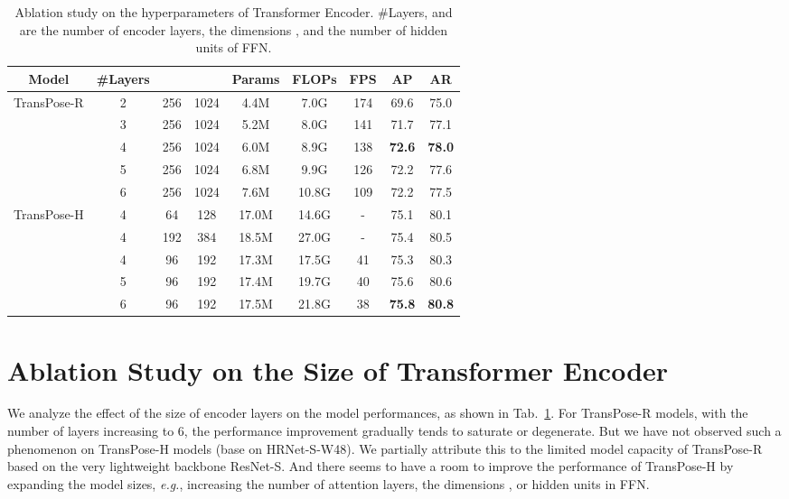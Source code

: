 \documentclass{article}
\begin{document}
\begin{table}
\centering
\renewcommand{\arraystretch}{1}
\setlength{\tabcolsep}{1mm}
\begin{tabular}{c|ccc|ccc|cc}
	\toprule
	Model & \#Layers &  &  & Params & FLOPs& FPS& AP & AR\\
	\midrule
	
	\multirow{5}{*}{TransPose-R}&2& 256& 1024& 4.4M & 7.0G & 174 & 69.6 & 75.0\\
	&3& 256& 1024 & 5.2M & 8.0G & 141 & 71.7 & 77.1 \\
	&4& 256& 1024 & 6.0M & 8.9G & 138 & \textbf{72.6} & \textbf{78.0} \\
	&5& 256& 1024 & 6.8M & 9.9G & 126 & 72.2 & 77.6 \\
	&6& 256& 1024 & 7.6M & 10.8G & 109 & 72.2 & 77.5 \\
	\midrule
	\multirow{5}{*}{TransPose-H}&4& 64& 128 & 17.0M & 14.6G & - & 75.1 & 80.1 \\
	&4& 192& 384 & 18.5M & 27.0G & - & 75.4 & 80.5 \\
	
	&4& 96& 192 & 17.3M & 17.5G & 41 & 75.3 & 80.3 \\
	&5& 96& 192 & 17.4M & 19.7G & 40 & 75.6 & 80.6 \\
	&6& 96& 192 & 17.5M & 21.8G & 38 & \textbf{75.8} & \textbf{80.8} \\
	\bottomrule
\end{tabular}
\caption{Ablation study on the hyperparameters of Transformer Encoder. \#Layers,  and  are the number of encoder layers, the dimensions , and the number of hidden units of FFN. }\vspace*{-0.1in}
\label{layers}
\end{table}




\section{Ablation Study on the Size of Transformer Encoder}

We analyze the effect of the size of encoder layers on the model performances, as shown in Tab.~\ref{layers}. For TransPose-R models, with the number of layers increasing to 6, the performance improvement gradually tends to saturate or degenerate. But we have not observed such a phenomenon on TransPose-H models (base on HRNet-S-W48). We partially attribute this to the limited model capacity of TransPose-R based on the very lightweight backbone ResNet-S. And there seems to have a room to improve the performance of TransPose-H by expanding the model sizes, \emph{e.g.}, increasing the number of attention layers, the dimensions , or hidden units in FFN. 
\end{document}
